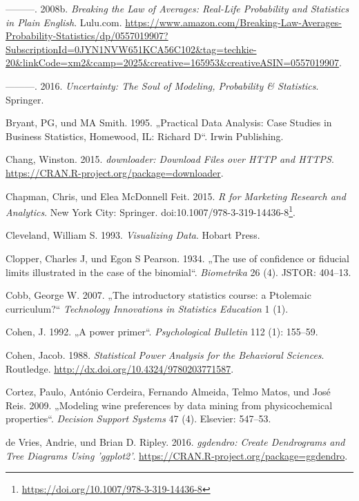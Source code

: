 \documentclass[12pt,ngerman,]{book}
\let\rmarkdownfootnote\footnote%
\def\footnote{\protect\rmarkdownfootnote}
\renewcommand{\href}[2]{#2\footnote{\url{#1}}}
\theoremstyle{definition}
\theoremstyle{definition}
\theoremstyle{remark}
\begin{document}
\hypertarget{ref-Breaking}{}
---------. 2008b. \emph{Breaking the Law of Averages: Real-Life
Probability and Statistics in Plain English}. Lulu.com.
\url{https://www.amazon.com/Breaking-Law-Averages-Probability-Statistics/dp/0557019907?SubscriptionId=0JYN1NVW651KCA56C102\&tag=techkie-20\&linkCode=xm2\&camp=2025\&creative=165953\&creativeASIN=0557019907}.

\hypertarget{ref-uncertainty}{}
---------. 2016. \emph{Uncertainty: The Soul of Modeling, Probability \&
Statistics}. Springer.

\hypertarget{ref-bryant1995practical}{}
Bryant, PG, und MA Smith. 1995. „Practical Data Analysis: Case Studies
in Business Statistics, Homewood, IL: Richard D``. Irwin Publishing.

\hypertarget{ref-R-downloader}{}
Chang, Winston. 2015. \emph{downloader: Download Files over HTTP and
HTTPS}. \url{https://CRAN.R-project.org/package=downloader}.

\hypertarget{ref-Chapman2015}{}
Chapman, Chris, und Elea McDonnell Feit. 2015. \emph{R for Marketing
Research and Analytics}. New York City: Springer.
doi:\href{https://doi.org/10.1007/978-3-319-14436-8}{10.1007/978-3-319-14436-8}.

\hypertarget{ref-Cleveland}{}
Cleveland, William S. 1993. \emph{Visualizing Data}. Hobart Press.

\hypertarget{ref-clopper1934use}{}
Clopper, Charles J, und Egon S Pearson. 1934. „The use of confidence or
fiducial limits illustrated in the case of the binomial``.
\emph{Biometrika} 26 (4). JSTOR: 404--13.

\hypertarget{ref-cobb2007introductory}{}
Cobb, George W. 2007. „The introductory statistics course: a Ptolemaic
curriculum?`` \emph{Technology Innovations in Statistics Education} 1
(1).

\hypertarget{ref-Cohen1992}{}
Cohen, J. 1992. „A power primer``. \emph{Psychological Bulletin} 112
(1): 155--59.

\hypertarget{ref-cohen_statistical_1988}{}
Cohen, Jacob. 1988. \emph{Statistical Power Analysis for the Behavioral
Sciences}. Routledge. \url{http://dx.doi.org/10.4324/9780203771587}.

\hypertarget{ref-cortez2009modeling}{}
Cortez, Paulo, António Cerdeira, Fernando Almeida, Telmo Matos, und José
Reis. 2009. „Modeling wine preferences by data mining from
physicochemical properties``. \emph{Decision Support Systems} 47 (4).
Elsevier: 547--53.

\hypertarget{ref-R-ggdendro}{}
de Vries, Andrie, und Brian D. Ripley. 2016. \emph{ggdendro: Create
Dendrograms and Tree Diagrams Using 'ggplot2'}.
\url{https://CRAN.R-project.org/package=ggdendro}.
\end{document}
